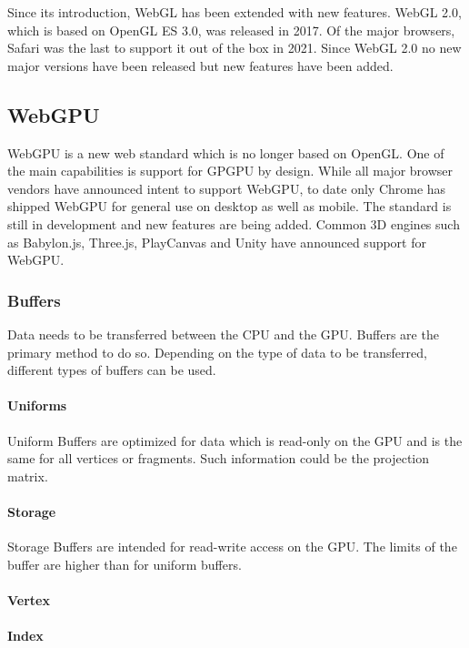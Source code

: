 Since its introduction, WebGL has been extended with new features. WebGL 2.0, which is based on OpenGL ES 3.0, was released in 2017. Of the major browsers, Safari was the last to support it out of the box in 2021. Since WebGL 2.0 no new major versions have been released but new features have been added.

\subsection{WebGPU}

WebGPU is a new web standard which is no longer based on OpenGL. One of the main capabilities is support for GPGPU by design. While all major browser vendors have announced intent to support WebGPU, to date only Chrome has shipped WebGPU for general use on desktop as well as mobile.
The standard is still in development and new features are being added.
Common 3D engines such as Babylon.js, Three.js, PlayCanvas and Unity have announced support for WebGPU.

\subsubsection{Buffers}

Data needs to be transferred between the CPU and the GPU. Buffers are the primary method to do so. Depending on the type of data to be transferred, different types of buffers can be used.

\paragraph{Uniforms}

Uniform Buffers are optimized for data which is read-only on the GPU and is the same for all vertices or fragments. Such information could be the projection matrix.

\paragraph{Storage}

Storage Buffers are intended for read-write access on the GPU. The limits of the buffer are higher than for uniform buffers.

\paragraph{Vertex}

\paragraph{Index}

